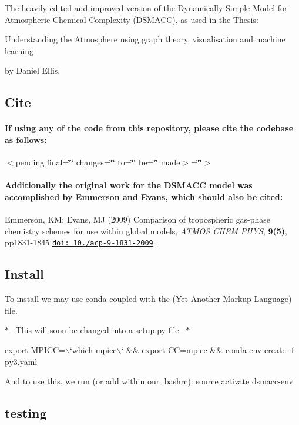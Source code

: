 The heavily edited and improved version of the Dynamically Simple Model for Atmospheric Chemical Complexity (D\+S\+M\+A\+CC), as used in the Thesis\+:

Understanding the Atmosphere using graph theory, visualisation and machine learning

by Daniel Ellis.

\subsection*{Cite}

\paragraph*{If using any of the code from this repository, please cite the codebase as follows\+:}

$<$pending final=\char`\"{}\char`\"{} changes=\char`\"{}\char`\"{} to=\char`\"{}\char`\"{} be=\char`\"{}\char`\"{} made$>$=\char`\"{}\char`\"{}$>$

\paragraph*{Additionally the original work for the D\+S\+M\+A\+CC model was accomplished by Emmerson and Evans, which should also be cited\+:}

Emmerson, KM; Evans, MJ (2009) Comparison of tropospheric gas-\/phase chemistry schemes for use within global models, {\itshape A\+T\+M\+OS C\+H\+EM P\+H\+YS}, {\bfseries 9(5)}, pp1831-\/1845 \href{http://dx.doi.org/10.5194/acp-9-1831-2009}{\tt doi\+: 10./acp-\/9-\/1831-\/2009} .

\subsection*{Install}

To install we may use conda coupled with the (Yet Another Markup Language) file.

$\ast$-- This will soon be changed into a setup.\+py file --$\ast$


\begin{DoxyCode}
export MPICC=\(\backslash\)`which mpicc\(\backslash\)` &&
export CC=mpicc &&
conda-env create -f py3.yaml
\end{DoxyCode}
 And to use this, we run (or add within our .bashrc)\+: {\ttfamily source activate dsmacc-\/env}

\subsection*{testing}

